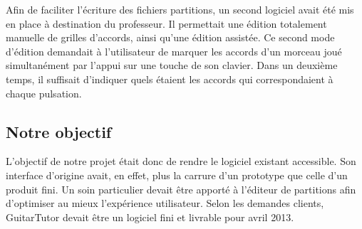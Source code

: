 Afin de faciliter l'écriture des fichiers partitions, un second logiciel avait été mis en place à destination du professeur. Il permettait une édition totalement manuelle de grilles d'accords, ainsi qu'une édition assistée. Ce second mode d'édition demandait à l'utilisateur de marquer les accords d'un morceau joué simultanément par l'appui sur une touche de son clavier. Dans un deuxième temps, il suffisait d'indiquer quels étaient les accords qui correspondaient à chaque pulsation.

\subsection*{Notre objectif}

L'objectif de notre projet était donc de rendre le logiciel existant accessible. Son interface d'origine avait, en effet, plus la carrure d'un prototype que celle d'un produit fini. Un soin particulier devait être apporté à l'éditeur de partitions afin d'optimiser au mieux l'expérience utilisateur. Selon les demandes clients, GuitarTutor devait être un logiciel fini et livrable pour avril 2013.
